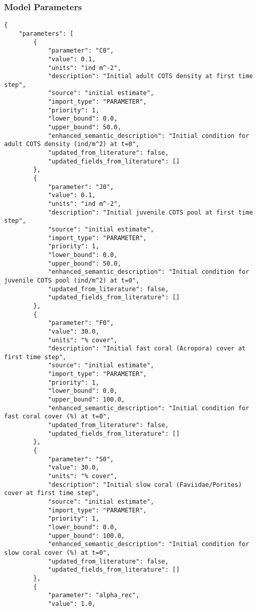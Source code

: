\subsubsection{Model Parameters}
\begin{lstlisting}
{
    "parameters": [
        {
            "parameter": "C0",
            "value": 0.1,
            "units": "ind m^-2",
            "description": "Initial adult COTS density at first time step",
            "source": "initial estimate",
            "import_type": "PARAMETER",
            "priority": 1,
            "lower_bound": 0.0,
            "upper_bound": 50.0,
            "enhanced_semantic_description": "Initial condition for adult COTS density (ind/m^2) at t=0",
            "updated_from_literature": false,
            "updated_fields_from_literature": []
        },
        {
            "parameter": "J0",
            "value": 0.1,
            "units": "ind m^-2",
            "description": "Initial juvenile COTS pool at first time step",
            "source": "initial estimate",
            "import_type": "PARAMETER",
            "priority": 1,
            "lower_bound": 0.0,
            "upper_bound": 50.0,
            "enhanced_semantic_description": "Initial condition for juvenile COTS pool (ind/m^2) at t=0",
            "updated_from_literature": false,
            "updated_fields_from_literature": []
        },
        {
            "parameter": "F0",
            "value": 30.0,
            "units": "% cover",
            "description": "Initial fast coral (Acropora) cover at first time step",
            "source": "initial estimate",
            "import_type": "PARAMETER",
            "priority": 1,
            "lower_bound": 0.0,
            "upper_bound": 100.0,
            "enhanced_semantic_description": "Initial condition for fast coral cover (%) at t=0",
            "updated_from_literature": false,
            "updated_fields_from_literature": []
        },
        {
            "parameter": "S0",
            "value": 30.0,
            "units": "% cover",
            "description": "Initial slow coral (Faviidae/Porites) cover at first time step",
            "source": "initial estimate",
            "import_type": "PARAMETER",
            "priority": 1,
            "lower_bound": 0.0,
            "upper_bound": 100.0,
            "enhanced_semantic_description": "Initial condition for slow coral cover (%) at t=0",
            "updated_from_literature": false,
            "updated_fields_from_literature": []
        },
        {
            "parameter": "alpha_rec",
            "value": 1.0,

\end{lstlisting}
